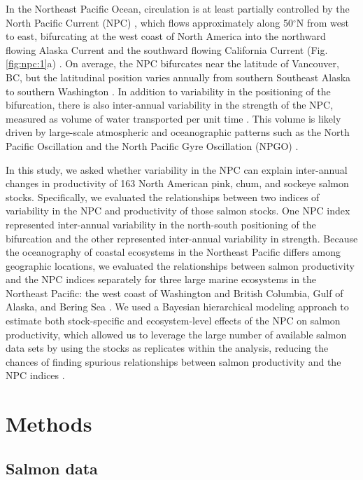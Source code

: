In the Northeast Pacific Ocean, circulation is at least partially controlled by
the North Pacific Current (NPC) \citep{Ware1989a, Cummins2007a}, which flows
approximately along 50$^{\circ}$N from west to east, bifurcating at the west
coast of North America into the northward flowing Alaska Current and the
southward flowing California Current (Fig. \ref{fig:npc:1}a) \citep{Ware1989a,
Chelton1982a}. On average, the NPC bifurcates near the latitude of Vancouver,
BC, but the latitudinal position varies annually from southern Southeast Alaska
to southern Washington \citep{Cummins2007a, Sydeman2011a}. In addition to
variability in the positioning of the bifurcation, there is also inter-annual
variability in the strength of the NPC, measured as volume of water transported
per unit time \citep{Freeland2006a, Cummins2007a}. This volume is likely driven
by large-scale atmospheric and oceanographic patterns such as the North Pacific
Oscillation and the North Pacific Gyre Oscillation (NPGO)
\citep{Di-Lorenzo2008a}.

In this study, we asked whether variability in the NPC can explain inter-annual
changes in productivity of 163 North American pink, chum, and sockeye salmon
stocks. Specifically, we evaluated the relationships between two indices of
variability in the NPC and productivity of those salmon stocks. One NPC index
represented inter-annual variability in the north-south positioning of the
bifurcation and the other represented inter-annual variability in strength.
Because the oceanography of coastal ecosystems in the Northeast Pacific differs
among geographic locations, we evaluated the relationships between salmon
productivity and the NPC indices separately for three large marine ecosystems in
the Northeast Pacific: the west coast of Washington and British Columbia, Gulf
of Alaska, and Bering Sea \citep{Sherman1999, Longhurst1995}. We used a Bayesian
hierarchical modeling approach to estimate both stock-specific and
ecosystem-level effects of the NPC on salmon productivity, which allowed us to
leverage the large number of available salmon data sets by using the stocks as
replicates within the analysis, reducing the chances of finding spurious
relationships between salmon productivity and the NPC indices \citep{Myers1998c,
Thorson2015b, Mueter2002a}.


\section{Methods}

\subsection{Salmon data}

